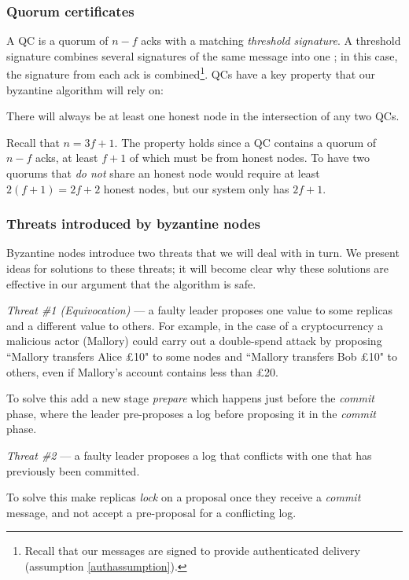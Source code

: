 \subsubsection{Quorum certificates}

A QC is a quorum of $n - f$ acks with a matching \textit{threshold signature}. A threshold signature combines several signatures of the same message into one \cite{shoupPracticalThresholdSignatures2000, cachinRandomOraclesConstantinople2005}; in this case, the signature from each ack is combined\footnote{Recall that our messages are signed to provide authenticated delivery (assumption \ref{authassumption}).}. QCs have a key property that our byzantine algorithm will rely on:

\begin{property} \label{qcproperty}
There will always be at least one honest node in the intersection of any two QCs.
\end{property}

Recall that $n = 3f + 1$. The property holds since a QC contains a quorum of $n - f$ acks, at least $f + 1$ of which must be from honest nodes. To have two quorums that \textit{do not} share an honest node would require at least $2(f + 1) = 2f + 2$ honest nodes, but our system only has $2f + 1$.

\subsubsection{Threats introduced by byzantine nodes}
Byzantine nodes introduce two threats that we will deal with in turn. We present ideas for solutions to these threats; it will become clear why these solutions are effective in our argument that the algorithm is safe.

\begin{description}
\item \textit{Threat \#1 (Equivocation)} --- a faulty leader proposes one value to some replicas and a different value to others. For example, in the case of a cryptocurrency a malicious actor (Mallory) could carry out a double-spend attack by proposing ``Mallory transfers Alice £10" to some nodes and ``Mallory transfers Bob £10" to others, even if Mallory's account contains less than £20. \label{threat1}

To solve this add a new stage \textit{prepare} which happens just before the \textit{commit} phase, where the leader pre-proposes a log before proposing it in the \textit{commit} phase.

\item \textit{Threat \#2} --- a faulty leader proposes a log that conflicts with one that has previously been committed. \label{threat2}

To solve this make replicas \textit{lock} on a proposal once they receive a \textit{commit} message, and not accept a pre-proposal for a conflicting log.
\end{description}

